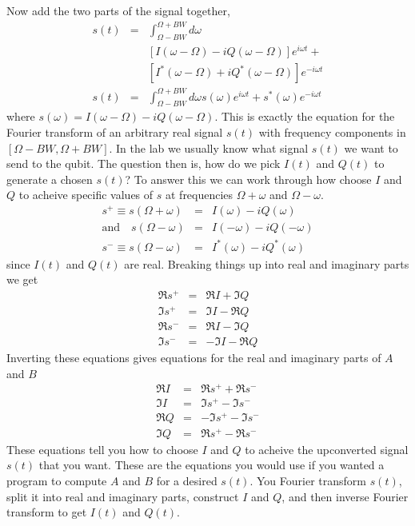 \documentclass{article}
\begin{document}
 Now add the two parts of the signal together,\begin{eqnarray*}
s(t) & = & \int_{\Omega-BW}^{\Omega+BW}d\omega\\
 &  & \left[I\left(\omega-\Omega\right)-iQ\left(\omega-\Omega\right)\right]e^{i\omega t}+\\
 &  & \left[I^{*}\left(\omega-\Omega\right)+iQ^{*}\left(\omega-\Omega\right)\right]e^{-i\omega t}\\
s(t) & = & \int_{\Omega-BW}^{\Omega+BW}d\omega s(\omega)e^{i\omega t}+s^{*}(\omega)e^{-i\omega t}\end{eqnarray*}
 where $s(\omega)=I(\omega-\Omega)-iQ(\omega-\Omega)$. This is exactly
the equation for the Fourier transform of an arbitrary real signal
$s(t)$ with frequency components in $\left[\Omega-BW,\Omega+BW\right]$.
In the lab we usually know what signal $s(t)$ we want to send to
the qubit. The question then is, how do we pick $I(t)$ and \textbf{$Q(t)$
}to generate a chosen $s(t)$? To answer this we can work through
how choose $I$ and $Q$ to acheive specific values of $s$ at frequencies
$\Omega+\omega$ and $\Omega-\omega$.\begin{eqnarray*}
s^{+}\equiv s(\Omega+\omega) & = & I(\omega)-iQ(\omega)\\
\textrm{and}\quad s(\Omega-\omega) & = & I(-\omega)-iQ(-\omega)\\
s^{-}\equiv s(\Omega-\omega) & = & I^{*}(\omega)-iQ^{*}(\omega)\end{eqnarray*}
 since $I(t)$ and $Q(t)$ are real. Breaking things up into real
and imaginary parts we get\begin{eqnarray*}
\Re s^{+} & = & \Re I+\Im Q\\
\Im s^{+} & = & \Im I-\Re Q\\
\Re s^{-} & = & \Re I-\Im Q\\
\Im s^{-} & = & -\Im I-\Re Q\end{eqnarray*}
 Inverting these equations gives equations for the real and imaginary
parts of $A$ and $B$\begin{eqnarray*}
\Re I & = & \Re s^{+}+\Re s^{-}\\
\Im I & = & \Im s^{+}-\Im s^{-}\\
\Re Q & = & -\Im s^{+}-\Im s^{-}\\
\Im Q & = & \Re s^{+}-\Re s^{-}\end{eqnarray*}
 These equations tell you how to choose $I$ and $Q$ to acheive the
upconverted signal $s(t)$ that you want. These are the equations
you would use if you wanted a program to compute $A$ and $B$ for
a desired $s(t)$. You Fourier transform $s(t)$, split it into real
and imaginary parts, construct $I$ and $Q$, and then inverse Fourier
transform to get $I(t)$ and $Q(t)$.
\end{document}
